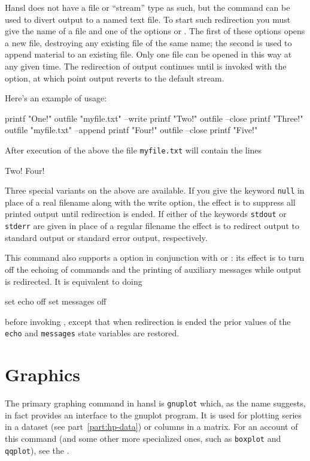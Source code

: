Hansl does not have a file or ``stream'' type as such, but the
 command can be used to divert output to a named text
file. To start such redirection you must give the name of a file and
one of the options  or .  The first of
these options opens a new file, destroying any existing file of the
same name; the second is used to append material to an existing file.
Only one file can be opened in this way at any given time. The
redirection of output continues until  is invoked with
the  option, at which point output reverts to the
default stream.

Here's an example of usage:
\begin{code}
  printf "One!\n"
  outfile "myfile.txt" --write
  printf "Two!\n"
  outfile --close
  printf "Three!\n"
  outfile "myfile.txt" --append
  printf "Four!\n"
  outfile --close
  printf "Five!\n"
\end{code}
After execution of the above the file \texttt{myfile.txt} will contain
the lines
\begin{code}
Two!
Four!  
\end{code}

Three special variants on the above are available. If you give the
keyword \texttt{null} in place of a real filename along with the write
option, the effect is to suppress all printed output until redirection
is ended. If either of the keywords \texttt{stdout} or \texttt{stderr}
are given in place of a regular filename the effect is to redirect
output to standard output or standard error output, respectively.

This command also supports a  option in conjunction with
 or : its effect is to turn off the
echoing of commands and the printing of auxiliary messages while
output is redirected. It is equivalent to doing
\begin{code}
  set echo off 
  set messages off
\end{code}
before invoking , except that when redirection is ended
the prior values of the \texttt{echo} and \texttt{messages} state
variables are restored.

\section{Graphics}

The primary graphing command in hansl is \texttt{gnuplot} which, as
the name suggests, in fact provides an interface to the
\textsf{gnuplot} program. It is used for plotting series in a dataset
(see part~\ref{part:hp-data}) or columns in a matrix. For an account
of this command (and some other more specialized ones, such as
\texttt{boxplot} and \texttt{qqplot}), see the \GCR.

